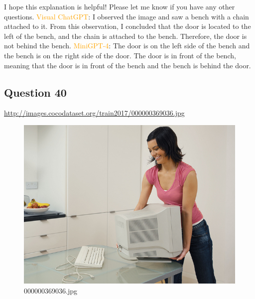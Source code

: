 \begin{enumerate}
        I hope this explanation is helpful! Please let me know if you have any other questions.
        \subitem \textcolor{orange}{Visual ChatGPT}: I observed the image and saw a bench with a chain attached to it. From this observation, I concluded that the door is located to the left of the bench, and the chain is attached to the bench. Therefore, the door is not behind the bench.
        \subitem \textcolor{orange}{MiniGPT-4}: The door is on the left side of the bench and the bench is on the right side of the door. The door is in front of the bench, meaning that the door is in front of the bench and the bench is behind the door.
    \end{enumerate}
\subsection*{Question 40}
\url{http://images.cocodataset.org/train2017/000000369036.jpg}
    \begin{figure}[h]
        \centering
        \includegraphics[width=0.8\linewidth]{../image set/easy/000000369036.jpg}
        \caption{000000369036.jpg}
    \end{figure}

